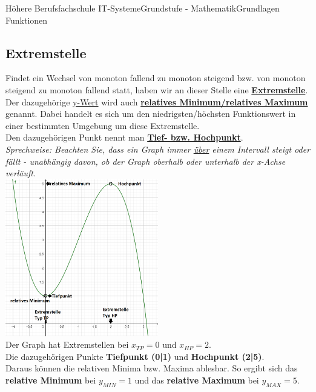\documentclass[11pt,twocolumn,oneside,openany,headings=optiontotoc,11pt,numbers=noenddot]{article}
\begin{document}
\begin{worksheet}{Höhere Berufsfachschule IT-Systeme}{Grundstufe - Mathematik}{Grundlagen Funktionen}
		\subsection*{Extremstelle}
		Findet ein Wechsel von monoton fallend zu monoton steigend bzw. von monoton steigend zu monoton fallend statt, haben wir an dieser Stelle eine \underline{\textbf{Extremstelle}}.\\
		Der dazugehörige \underline{y-Wert} wird auch \underline{\textbf{relatives Minimum/relatives Maximum}} genannt. Dabei handelt es sich um den niedrigsten/höchsten Funktionswert in einer bestimmten Umgebung um diese Extremstelle.\\
		Den dazugehörigen Punkt nennt man \textbf{\underline{Tief- bzw. Hochpunkt}}.\\
		\textit{Sprechweise: Beachten Sie, dass ein Graph immer \underline{über} einem Intervall steigt oder fällt - unabhängig davon, ob der Graph oberhalb oder unterhalb der x-Achse verläuft.}\\
		\includegraphics[width=0.5\textwidth]{../99_Bilder/EP.png}\\
		Der Graph hat Extremstellen bei \(x_{TP} = 0\) und \(x_{HP} = 2\).\\
		Die dazugehörigen Punkte \textbf{Tiefpunkt (0|1)} und \textbf{Hochpunkt (2|5)}.\\
		Daraus können die relativen Minima bzw. Maxima ablesbar. So ergibt sich das \textbf{relative Minimum} bei \( y_{MIN} = 1\) und das \textbf{relative Maximum} bei \(y_{MAX} = 5\).

\end{worksheet}
\end{document}
